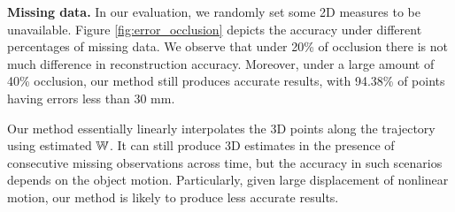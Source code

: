 \textbf{Missing data.} %
In our evaluation, we randomly set some 2D measures to be unavailable. Figure \ref{fig:error_occlusion} depicts the accuracy under different percentages of missing data. We observe that under 20\% of occlusion there is not much difference in reconstruction accuracy. Moreover, under a large amount of 40\% occlusion, our method still produces accurate results,  with 94.38\% of points having errors less than 30 mm. 

Our method essentially linearly interpolates the 3D points along the trajectory using estimated  $\mathbb W$. It can still produce 3D estimates in the presence of consecutive missing observations across time, but the accuracy in such scenarios depends on the object motion. Particularly, given large displacement of nonlinear motion, our method is likely to produce less accurate results.

